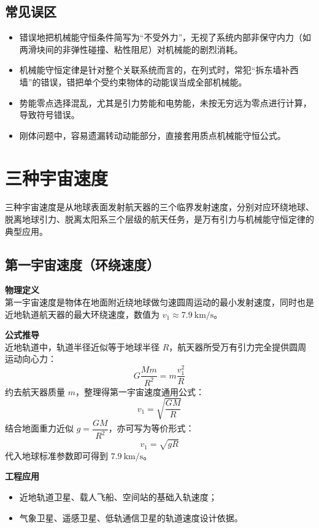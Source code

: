 \subsection{常见误区}
\begin{itemize}
    \item 错误地把机械能守恒条件简写为“不受外力”，无视了系统内部非保守内力（如两滑块间的非弹性碰撞、粘性阻尼）对机械能的剧烈消耗。
    \item 机械能守恒定律是针对整个关联系统而言的，在列式时，常犯“拆东墙补西墙”的错误，错把单个受约束物体的动能误当成全部机械能。
    \item 势能零点选择混乱，尤其是引力势能和电势能，未按无穷远为零点进行计算，导致符号错误。
    \item 刚体问题中，容易遗漏转动动能部分，直接套用质点机械能守恒公式。
\end{itemize}

\newpage

\section{三种宇宙速度}
三种宇宙速度是从地球表面发射航天器的三个临界发射速度，分别对应环绕地球、脱离地球引力、脱离太阳系三个层级的航天任务，是万有引力与机械能守恒定律的典型应用。

\subsection{第一宇宙速度（环绕速度）}
\textbf{物理定义\\}
第一宇宙速度是物体在地面附近绕地球做匀速圆周运动的最小发射速度，同时也是近地轨道航天器的最大环绕速度，数值为 \(v_1 \approx 7.9\ \mathrm{km/s}\)。

\textbf{公式推导\\}
近地轨道中，轨道半径近似等于地球半径 \(R\)，航天器所受万有引力完全提供圆周运动向心力：
\[
G \frac{M m}{R^2} = m \frac{v_1^2}{R}
\]
约去航天器质量 \(m\)，整理得第一宇宙速度通用公式：
\[
v_1 = \sqrt{\frac{GM}{R}}
\]
结合地面重力近似 \(g=\dfrac{GM}{R^2}\)，亦可写为等价形式：
\[
v_1 = \sqrt{gR}
\]
代入地球标准参数即可得到 \(7.9\ \mathrm{km/s}\)。

\textbf{工程应用}
\begin{itemize}
    \item 近地轨道卫星、载人飞船、空间站的基础入轨速度；
    \item 气象卫星、遥感卫星、低轨通信卫星的轨道速度设计依据。
\end{itemize}

